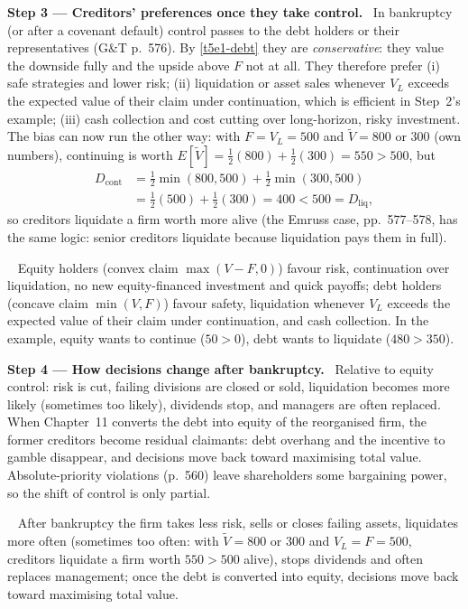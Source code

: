 \documentclass[11pt,a4paper]{article}
\newcommand{\step}[2]{\par\medskip\noindent\textbf{Step #1 --- #2.}~}
\newcommand{\answer}[1]{\par\smallskip\noindent\fbox{\textbf{Answer #1.}}~}
\begin{document}
\step{3}{Creditors' preferences once they take control} In bankruptcy (or after a covenant
default) control passes to the debt holders or their representatives (G\&T p.~576). By
\eqref{t5e1-debt} they are \emph{conservative}: they value the downside fully and the upside above
$F$ not at all. They therefore prefer (i) safe strategies and lower risk; (ii) liquidation or asset
sales whenever $V_L$ exceeds the expected value of their claim under continuation, which is
efficient in Step~2's example; (iii) cash collection and cost cutting over long-horizon, risky
investment. The bias can now run the other way: with $F=V_L=500$ and $\tilde V=800$ or $300$
(own numbers), continuing is worth $E[\tilde V]=\tfrac12(800)+\tfrac12(300)=550>500$, but
\begin{align}
  D_{\text{cont}} &= \tfrac12\min(800,500)+\tfrac12\min(300,500) \label{t5e1-Dcont2}\\
                  &= \tfrac12(500)+\tfrac12(300) = 400 < 500 = D_{\text{liq}}, \nonumber
\end{align}
so creditors liquidate a firm worth more alive (the Emruss case, pp.~577--578, has the same logic:
senior creditors liquidate because liquidation pays them in full).

\answer{(preferences)} Equity holders (convex claim $\max(V-F,0)$) favour risk, continuation over
liquidation, no new equity-financed investment and quick payoffs; debt holders (concave claim
$\min(V,F)$) favour safety, liquidation whenever $V_L$ exceeds the expected value of their claim under
continuation, and cash collection. In the example, equity wants to continue ($50>0$), debt wants to
liquidate ($480>350$).

\step{4}{How decisions change after bankruptcy} Relative to equity control: risk is cut, failing
divisions are closed or sold, liquidation becomes more likely (sometimes too likely), dividends stop,
and managers are often replaced. When Chapter~11 converts the debt into equity of the reorganised
firm, the former creditors become residual claimants: debt overhang and the incentive to gamble
disappear, and decisions move back toward maximising total value. Absolute-priority violations
(p.~560) leave shareholders some bargaining power, so the shift of control is only partial.

\answer{(decisions)} After bankruptcy the firm takes less risk, sells or closes failing assets,
liquidates more often (sometimes too often: with $\tilde V=800$ or $300$ and $V_L=F=500$, creditors
liquidate a firm worth $550>500$ alive), stops dividends and often replaces management; once the debt is
converted into equity, decisions move back toward maximising total value.
\end{document}
